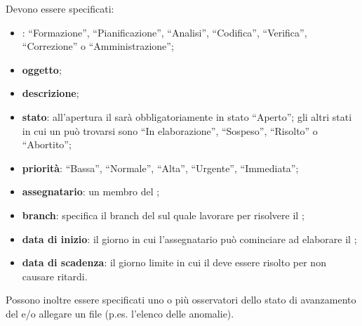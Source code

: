 \documentclass[a4paper, titlepage]{article}
\begin{document}
Devono essere specificati:
\begin{itemize}
	\item \textbf{}: ``Formazione'', ``Pianificazione'', ``Analisi'', ``Codifica'', ``Verifica'', ``Correzione'' o ``Amministrazione'';
	\item \textbf{oggetto};
	\item \textbf{descrizione};
	\item \textbf{stato}: all'apertura il  sarà obbligatoriamente in stato ``Aperto''; gli altri stati in cui un  può trovarsi sono ``In elaborazione'', ``Sospeso'', ``Risolto'' o ``Abortito'';
	\item \textbf{priorità}: ``Bassa'', ``Normale'', ``Alta'', ``Urgente'', ``Immediata'';
	\item \textbf{assegnatario}: un membro del ;
	\item \textbf{branch}: specifica il branch del  sul quale lavorare per risolvere il ;
	\item \textbf{data di inizio}: il giorno in cui l'assegnatario può cominciare ad elaborare il ;
	\item \textbf{data di scadenza}: il giorno limite in cui il  deve essere risolto per non causare ritardi.
\end{itemize}
Possono inoltre essere specificati uno o più osservatori dello stato di avanzamento del  e/o allegare un file (p.es. l'elenco delle anomalie).
\end{document}
